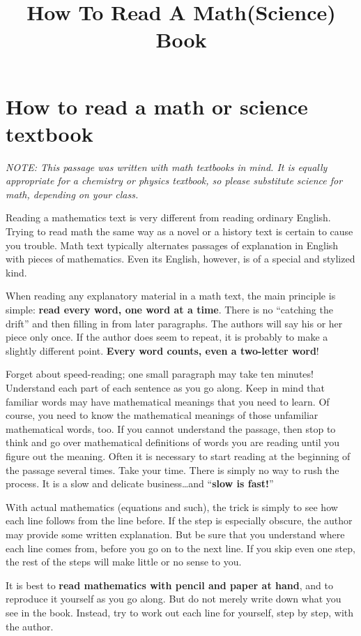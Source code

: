 \documentclass[../main.tex]{subfiles}
\title{How To Read A Math(Science) Book}
\begin{document}
\maketitle
%
\section{How to read a math or science textbook}
\emph{NOTE: This passage was written with math textbooks in mind.
It is equally appropriate for a chemistry or physics textbook,
so please substitute science for math, depending on your class.}

Reading a mathematics text is very different from reading ordinary English.
Trying to read math the same way as a novel or a history text is certain to cause you
trouble. Math text typically alternates passages of explanation in English with pieces of
mathematics. Even its English, however, is of a special and stylized kind.

When reading any explanatory material in a math text,
the main principle is simple: \textbf{read every word, one word at a time}.
There is no ``catching the drift'' and then filling in from later paragraphs.
The authors will say his or her piece only once. If the author does seem to repeat,
it is probably to make a slightly different point.
\textbf{Every word counts, even a two-letter word}!

Forget about speed-reading; one small paragraph may take ten minutes!
Understand each part of each sentence as you go along. Keep in mind that familiar words
may have mathematical meanings that you need to learn. Of course, you need to know
the mathematical meanings of those unfamiliar mathematical words, too. If you cannot
understand the passage, then stop to think and go over mathematical definitions of words
you are reading until you figure out the meaning. Often it is necessary to start reading at
the beginning of the passage several times. Take your time. There is simply no way to
rush the process. It is a slow and delicate business…and ``\textbf{slow is fast!}''

With actual mathematics (equations and such), the trick is simply to see how each
line follows from the line before. If the step is especially obscure, the author may
provide some written explanation. But be sure that you understand where each line
comes from, before you go on to the next line. If you skip even one step, the rest of the
steps will make little or no sense to you.

It is best to \textbf{read mathematics with pencil and paper at hand}, and to reproduce it
yourself as you go along. But do not merely write down what you see in the book.
Instead, try to work out each line for yourself, step by step, with the author.
\end{document}
